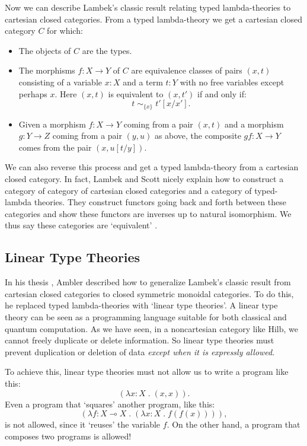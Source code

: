 \documentclass[12pt]{article}
\newcommand{\Hilb}{\mathrm{Hilb}}
\newcommand{\maps}{\colon}
\newcommand{\lhom}{\multimap}
\begin{document}
Now we can describe Lambek's classic result relating typed
lambda-theories to cartesian closed categories.  From a typed
lambda-theory we get a cartesian closed category $C$ for which:
\begin{itemize}
\item
The objects of $C$ are the types.
\item 
The morphisms $f \maps X \to Y$ of $C$
are equivalence classes of pairs
$(x,t)$ consisting of a variable $x\!:\!X$ and a term $t\!:\!Y$ with
no free variables except perhaps $x$.  Here $(x,t)$ is equivalent
to $(x,t')$ if and only if:
\[     t \; \sim_{\{x\}} \; t'[x/x'] . \]
\item Given a morphism $f \maps X \to Y$
coming from a pair $(x,t)$ and a morphism $g \maps Y \to Z$
coming from a pair $(y,u)$ as above, the composite 
$gf \maps X \to Y$ comes from the pair $(x,u[t/y])$.
\end{itemize}
We can also reverse this process and get a typed lambda-theory from a
cartesian closed category.  In fact, Lambek and Scott nicely explain
how to construct a category of category of cartesian closed categories
and a category of typed-lambda theories.  They construct functors
going back and forth between these categories and show these functors
are inverses up to natural isomorphism.  We thus say these categories
are `equivalent' \cite{LS}.

\subsection{Linear Type Theories}
\label{linear_type_theories}

In his thesis \cite{Ambler}, Ambler described how to generalize
Lambek's classic result from cartesian closed categories to closed
symmetric monoidal categories.  To do this, he replaced typed
lambda-theories with `linear type theories'.  A linear type theory can
be seen as a programming language suitable for both classical and
quantum computation.  As we have seen, in a noncartesian category like
$\Hilb$, we cannot freely duplicate or delete information.  So linear
type theories must prevent duplication or deletion of data {\it except
when it is expressly allowed}.

To achieve this, linear type theories must not allow us to write a
program like this:
\[    (\lambda x\!:\!X \; . \; (x,x)) .      \]
Even a program that `squares' another program, like this:
\[   
 (\lambda f\!:\!X \lhom X \;.\;(\lambda \!x:\!X \; . \; f(f(x)))), \]
is not allowed, since it `reuses' the variable $f$.  On the other
hand, a program that composes two programs is allowed!
\end{document}
